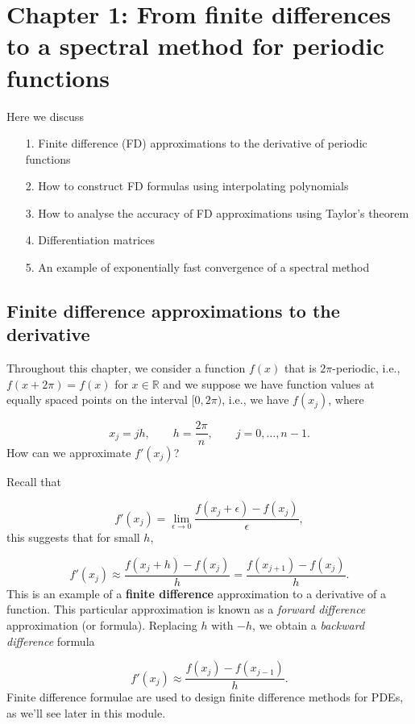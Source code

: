 \documentclass[12pt,a4paper]{article}
\begin{document}
\section{Chapter 1: From finite differences to a spectral method for periodic functions}
Here we discuss

\begin{itemize}
\item[1. ] Finite difference (FD) approximations to the derivative of periodic functions


\item[2. ] How to construct FD formulas using interpolating polynomials


\item[3. ] How to analyse the accuracy of FD approximations using Taylor's theorem


\item[4. ] Differentiation matrices


\item[5. ] An example of exponentially fast convergence of a spectral method

\end{itemize}
\subsection{Finite difference approximations to the derivative}
Throughout this chapter, we consider a function $f(x)$ that is $2\pi$-periodic, i.e., $f(x+2\pi) = f(x)$ for $x \in \mathbb{R}$ and we suppose we have function values at equally spaced points on the interval $[0, 2\pi)$, i.e., we have $f(x_j)$, where

\[
x_j = jh, \qquad h = \frac{2\pi}{n}, \qquad j = 0, \ldots, n-1.
\]
How can we approximate $f'(x_j)$?

Recall that

\[
f'(x_j) = \lim_{\epsilon \to 0} \frac{f(x_j +\epsilon) - f(x_j)}{\epsilon},
\]
this suggests that for small $h$,

\[
f'(x_j) \approx \frac{f(x_j+h)-f(x_j)}{h} = \frac{f(x_{j+1})-f(x_j)}{h}. 
\]
This is an example of a \textbf{finite difference} approximation to a derivative of a function.  This particular approximation is known as a \emph{forward difference} approximation (or formula).  Replacing $h$ with $-h$, we obtain a \emph{backward difference} formula

\[
f'(x_j) \approx \frac{f(x_{j})-f(x_{j-1})}{h}.
\]
Finite difference formulae are used to design finite difference methods for PDEs, as we'll see later in this module.
\end{document}
